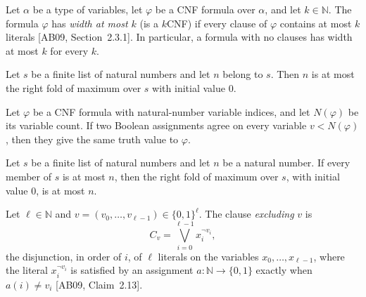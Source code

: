 \begin{definition}
\label{Std.Sat.CNF.WidthAtMost}
\leanok
Let $\alpha$ be a type of variables, let $\varphi$ be a CNF formula over $\alpha$, and
let $k \in \mathbb{N}$. The formula $\varphi$ has \emph{width at most $k$} (is a
$k$CNF) if every clause of $\varphi$ contains at most $k$ literals
[AB09, Section~2.3.1]. In particular, a formula with no clauses has width at most $k$
for every $k$.
\end{definition}

\begin{theorem}
\label{Complexity.le_foldr_max_of_mem}
\leanok
{}
Let $s$ be a finite list of natural numbers and let $n$ belong to $s$. Then $n$ is at
most the right fold of maximum over $s$ with initial value $0$.
\end{theorem}

\begin{theorem}
\label{Complexity.eval_congr_of_lt_numVars}
\leanok
{}
Let $\varphi$ be a CNF formula with natural-number variable indices, and let
$N(\varphi)$ be its variable count. If two Boolean assignments agree on every variable
$v<N(\varphi)$, then they give the same truth value to $\varphi$.
\end{theorem}

\begin{theorem}
\label{Complexity.foldr_max_le_of_forall}
\leanok
{}
Let $s$ be a finite list of natural numbers and let $n$ be a natural number. If every
member of $s$ is at most $n$, then the right fold of maximum over $s$, with initial
value $0$, is at most $n$.
\end{theorem}

\begin{definition}
\label{Complexity.falsifyingClause}
\leanok
Let $\ell \in \mathbb{N}$ and $v = (v_0, \dots, v_{\ell-1}) \in \{0,1\}^\ell$. The
clause \emph{excluding} $v$ is
\[ C_v = \bigvee_{i=0}^{\ell-1} x_i^{\neg v_i}, \]
the disjunction, in order of $i$, of $\ell$ literals on the variables
$x_0, \dots, x_{\ell-1}$, where the literal $x_i^{\neg v_i}$ is satisfied by an
assignment $a : \mathbb{N} \to \{0,1\}$ exactly when $a(i) \ne v_i$
[AB09, Claim~2.13].
\end{definition}

